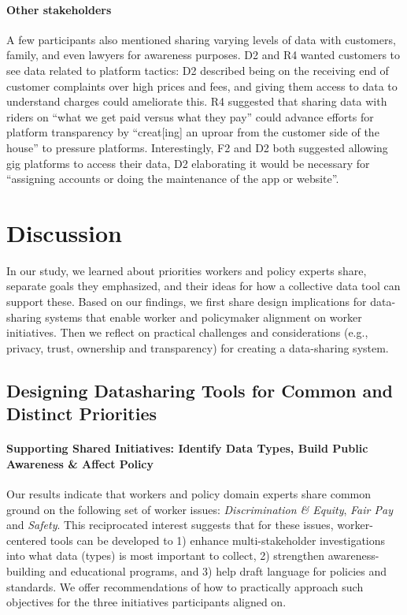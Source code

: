 \paragraph{Other stakeholders}
A few participants also mentioned sharing varying levels of data with customers, family, and even lawyers for awareness purposes. D2 and R4 wanted customers to see data related to platform tactics: D2 described being on the receiving end of customer complaints over high prices and fees, and giving them access to data to understand charges could ameliorate this. R4 suggested that sharing data with riders on ``what we get paid versus what they pay'' could advance efforts for platform transparency by ``creat[ing] an uproar from the customer side of the house'' to pressure platforms. Interestingly, F2 and D2 both suggested allowing gig platforms to access their data, D2 elaborating it would be necessary for ``assigning accounts or doing the maintenance of the app or website''. 

\section{Discussion}\label{h.yin5uhe4br0e}
{In our study, we learned about priorities workers and policy experts share, separate goals they emphasized, and their ideas for how a collective data tool can support these. Based on our findings, we first share design implications for data-sharing systems that enable worker and policymaker alignment on worker initiatives. Then we reflect on practical challenges and considerations (e.g., privacy, trust, ownership and transparency) for creating a data-sharing system.}

\subsection{{Designing Datasharing Tools for Common and Distinct Priorities}} \label{discussion-multi-stakeholder}

\paragraph{{Supporting Shared Initiatives: Identify Data Types, Build Public Awareness \& Affect Policy}}

{Our results indicate that workers and policy domain experts share common ground on the following set of worker issues: \textit{Discrimination \& Equity}, \textit{Fair Pay} and \textit{Safety}. This reciprocated interest suggests that for these issues, 
worker-centered tools can be developed to 1) enhance multi-stakeholder investigations into what data (types) is most important to collect, 2) strengthen awareness-building and educational programs, and 3) help draft language for policies and standards. 
We offer recommendations of how to practically approach such objectives for the three initiatives participants aligned on.}

